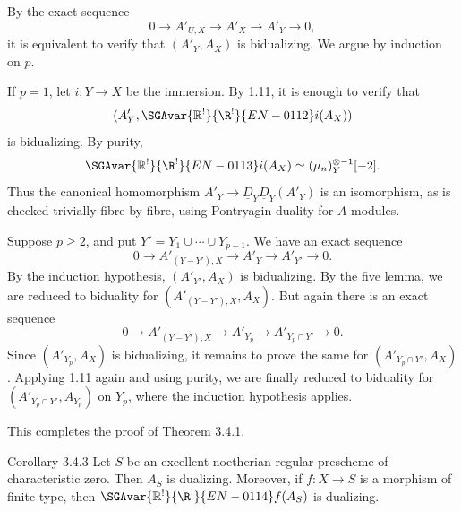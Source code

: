 \begin{prooftext}
By the exact sequence
\[
   0\longrightarrow A'_{U,X}\longrightarrow A'_X\longrightarrow A'_Y\longrightarrow0,
\]
it is equivalent to verify that $(A'_Y,A_X)$ is bidualizing. We argue by induction on $p$.

If $p=1$, let $i:Y\to X$ be the immersion. By 1.11, it is enough to verify that
\[
   (A'_Y,\SGAvar{\mathbb{R}^!}{\R^!}{EN-0112}i(A_X))
\]
is bidualizing. By purity,
\[
   \SGAvar{\mathbb{R}^!}{\R^!}{EN-0113}i(A_X)\simeq(\mu_n)^{\otimes -1}_Y[-2].
\]
Thus the canonical homomorphism $A'_Y\to\underline D_Y\underline D_Y(A'_Y)$ is an isomorphism, as is checked trivially fibre by fibre, using Pontryagin duality for $A$-modules.

Suppose $p\ge2$, and put $Y'=Y_1\cup\cdots\cup Y_{p-1}$. We have an exact sequence
\[
   0\longrightarrow A'_{(Y-Y'),X}\longrightarrow A'_Y\longrightarrow A'_{Y'}\longrightarrow0.
\]
By the induction hypothesis, $(A'_{Y'},A_X)$ is bidualizing. By the five lemma, we are reduced to biduality for $(A'_{(Y-Y'),X},A_X)$. But again there is an exact sequence
\[
   0\longrightarrow A'_{(Y-Y'),X}\longrightarrow A'_{Y_p}\longrightarrow A'_{Y_p\cap Y'}\longrightarrow0.
\]
Since $(A'_{Y_p},A_X)$ is bidualizing, it remains to prove the same for $(A'_{Y_p\cap Y'},A_X)$. Applying 1.11 again and using purity, we are finally reduced to biduality for $(A'_{Y_p\cap Y'},A_{Y_p})$ on $Y_p$, where the induction hypothesis applies. \qedtext
\end{prooftext}

This completes the proof of Theorem 3.4.1.

\begin{statement}{Corollary 3.4.3}
Let $S$ be an excellent noetherian regular prescheme of characteristic zero. Then $A_S$ is dualizing. Moreover, if $f:X\to S$ is a morphism of finite type, then $\SGAvar{\mathbb{R}^!}{\R^!}{EN-0114}f(A_S)$ is dualizing.
\end{statement}


